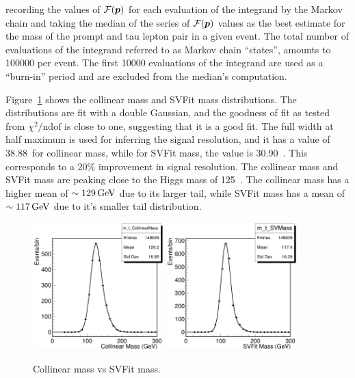 recording the values of $\mathcal{F}(\boldsymbol{p})$ for each evaluation of the integrand by the Markov chain and taking the median of the series of $\mathcal{F}(\boldsymbol{p})$ values as the best estimate \mlt for the mass of the prompt and tau lepton pair in a given event. The total number of evaluations of the integrand referred to as Markov chain ``states'', amounts to 100000 per event. The first 10000 evaluations of the integrand are used as a ``burn-in'' period and are excluded from the median's computation.

Figure~\ref{fig:svfit} shows the collinear mass and SVFit mass distributions. The distributions are fit with a double Gaussian, and the goodness of fit as tested from $\chi^2/\text{ndof}$ is close to one, suggesting that it is a good fit. The full width at half maximum is used for inferring the signal resolution, and it has a value of 38.88~\GeV for collinear mass, while for SVFit mass, the value is 30.90~\GeV. This corresponds to a 20\% improvement in signal resolution. The collinear mass and SVFit mass are peaking close to the Higgs mass of 125~\GeV. The collinear mass has a higher mean of $\sim 129 \,\text{Ge\hspace{-.08em}V}$ due to its larger tail, while SVFit mass has a mean of $\sim 117 \,\text{Ge\hspace{-.08em}V}$ due to it's smaller tail distribution.

\begin{figure}[!htpb]
  \centering
  \includegraphics[width=0.45\textwidth]{plots/appendix/CollMass.png}
  \includegraphics[width=0.45\textwidth]{plots/appendix/SVFit.png}
  \caption{Collinear mass vs SVFit mass.}
  \label{fig:svfit}
\end{figure}

